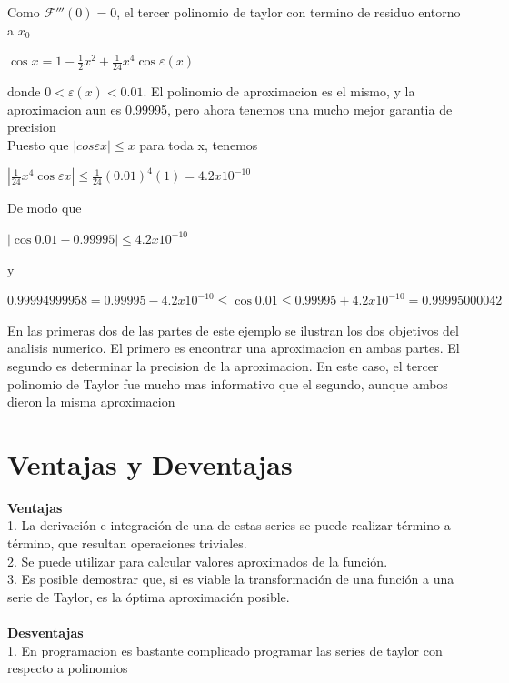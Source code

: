 \documentclass{article}
\begin{document}
\begin{multicols}{2}
Como $\mathcal{F}'''(0)=0$, el tercer polinomio de taylor con termino de residuo entorno a $x_{0}$
\begin{center}
$\cos x = 1-\frac{1}{2}x^{2}+\frac{1}{24}x^{4}\cos \varepsilon (x)$
\end{center}
donde $0< \varepsilon (x) < 0.01 $. El polinomio de aproximacion es el mismo, y la aproximacion aun es 0.99995, pero ahora tenemos una mucho mejor garantia de precision
\\
Puesto que $|cos \varepsilon x| \leq x$ para toda x, tenemos
\begin{center}
$|\frac{1}{24}x^{4}\cos \varepsilon x| \leq \frac{1}{24}(0.01)^{4}(1)=4.2x10^{-10}$
\end{center}
De modo que
\begin{center}
$|\cos 0.01 - 0.99995|\leq 4.2x10^{-10}$
\end{center}
y 
\begin{center}
$0.99994999958 = 0.99995 - 4.2x10^{-10} \leq \cos 0.01 \leq 0.99995 + 4.2x10^{-10} = 0.99995000042$
\end{center}
En las primeras dos de las partes de este ejemplo se ilustran los dos objetivos del analisis numerico.
El primero es encontrar una aproximacion en ambas partes. El segundo es determinar la precision de la aproximacion. En este caso, el tercer polinomio de Taylor fue mucho mas informativo que el segundo, aunque ambos dieron la misma aproximacion

\section{Ventajas y Deventajas}
\label{sec:Ven}
\textbf{Ventajas}
\\
1. La derivación e integración de una de estas series se puede realizar término a término, que resultan operaciones triviales.
\\
2. Se puede utilizar para calcular valores aproximados de la función.
\\
3. Es posible demostrar que, si es viable la transformación de una función a una serie de Taylor, es la óptima aproximación posible.
\\
\\
\textbf{Desventajas}
\\
1. En programacion es bastante complicado programar las series de taylor con respecto a polinomios

 

\end{multicols}
\end{document}
